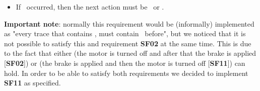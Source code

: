 \begin{itemize}
\begin{itemize}
        \item If \releaseVerticalBrake\ occurred, then the next action must be \motorUp\ or \motorDown.
    \end{itemize}
    \textbf{Important note}: normally this requirement would be (informally) implemented as  "every trace that contains \verticalMotorOff, must contain \applyVerticalBrake\ before",
    but we noticed that it is not possible to satisfy this and requirement \textbf{SF02} at the same time. This is due to the fact that either (the motor is turned off and after that the brake is applied [\textbf{SF02}]) or (the brake is applied and then the motor is turned off [\textbf{SF11}]) can hold. In order to be able to satisfy both requirements we decided to implement \textbf{SF11} as specified.

\end{itemize}

